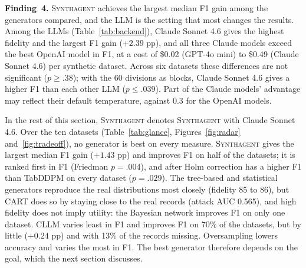 \documentclass[conference]{IEEEtran}
\newcommand{\system}{\textsc{Synthagent}\xspace}
\begin{document}
\textbf{Finding~4.} \system achieves the largest median F1 gain among the generators compared, and the LLM is the setting that most changes the results. Among the LLMs (Table~\ref{tab:backend}), Claude Sonnet 4.6 gives the highest fidelity and the largest F1 gain ($+2.39$ pp), and all three Claude models exceed the best OpenAI model in F1, at a cost of \$0.02 (GPT-4o mini) to \$0.49 (Claude Sonnet 4.6) per synthetic dataset. Across six datasets these differences are not significant ($p\ge.38$); with the 60 divisions as blocks, Claude Sonnet 4.6 gives a higher F1 than each other LLM ($p\le.039$). Part of the Claude models' advantage may reflect their default temperature, against 0.3 for the OpenAI models.





In the rest of this section, \system denotes \system with Claude Sonnet 4.6. Over the ten datasets (Table~\ref{tab:glance}, Figures~\ref{fig:radar} and~\ref{fig:tradeoff}), no generator is best on every measure. \system gives the largest median F1 gain ($+1.43$ pp) and improves F1 on half of the datasets; it is ranked first in F1 (Friedman $p=.004$), and after Holm correction has a higher F1 than TabDDPM on every dataset ($p=.029$). The tree-based and statistical generators reproduce the real distributions most closely (fidelity 85 to 86), but CART does so by staying close to the real records (attack AUC 0.565), and high fidelity does not imply utility: the Bayesian network improves F1 on only one dataset. CLLM varies least in F1 and improves F1 on 70\% of the datasets, but by little ($+0.24$ pp) and with 13\% of the records missing. Oversampling lowers accuracy and varies the most in F1. The best generator therefore depends on the goal, which the next section discusses.





\end{document}
